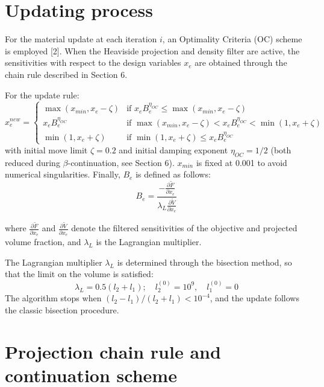 \documentclass{article}
\begin{document}
\section{Updating process}

\noindent For the material update at each iteration $i$, an Optimality Criteria (OC) scheme is employed [2]. When the Heaviside projection and density filter are active, the sensitivities with respect to the design variables $x_e$ are obtained through the chain rule described in Section 6.

For the update rule:
\begin{equation}\label{eq:oc_update}
x_e^{new} = \begin{cases}
\max(x_{min}, x_e - \zeta) & \text{if } x_e B_e^{\eta_{OC}} \leq \max(x_{min}, x_e - \zeta) \\
x_e B_e^{\eta_{OC}} & \text{if } \max(x_{min}, x_e - \zeta) < x_e B_e^{\eta_{OC}} < \min(1, x_e + \zeta) \\
\min(1, x_e + \zeta) & \text{if } \min(1, x_e + \zeta) \leq x_e B_e^{\eta_{OC}}
\end{cases}
\end{equation}
\noindent with initial move limit $\zeta = 0.2$ and initial damping exponent $\eta_{OC} = 1/2$ (both reduced during $\beta$-continuation, see Section 6). $x_{min}$ is fixed at 0.001 to avoid numerical singularities. Finally, $B_e$ is defined as follows:
\begin{equation}\label{eq:oc_be}
B_e = \frac{-\frac{\partial \tilde{F}}{\partial x_e}}{\lambda_L \frac{\partial \tilde{V}}{\partial x_e}}
\end{equation}

where $\frac{\partial \tilde{F}}{\partial x_e}$ and $\frac{\partial \tilde{V}}{\partial x_e}$ denote the filtered sensitivities of the objective and projected volume fraction, and $\lambda_L$ is the Lagrangian multiplier.

The Lagrangian multiplier $\lambda_L$ is determined through the bisection method, so that the limit on the volume is satisfied:
\begin{equation}\label{eq:bisection}
\lambda_L = 0.5(l_2 + l_1); \quad l_2^{(0)} = 10^9, \quad l_1^{(0)} = 0
\end{equation}
\noindent The algorithm stops when $(l_2 - l_1)/(l_2 + l_1) < 10^{-4}$, and the update follows the classic bisection procedure.

\section{Projection chain rule and continuation scheme}
\end{document}
